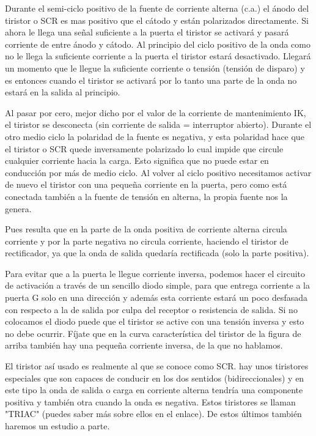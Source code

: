 \documentclass[12pt,a4paper]{article}
\begin{document}
\begin{flushleft}
\newpage
Durante el semi-ciclo positivo de la fuente de corriente alterna (c.a.) el ánodo del tiristor o SCR es mas positivo que el cátodo y están polarizados directamente. Si ahora le llega una señal suficiente a la puerta el tiristor se activará y pasará corriente de entre ánodo y cátodo. Al principio del ciclo positivo de la onda como no le llega la suficiente corriente a la puerta el tiristor estará desactivado. Llegará un momento que le llegue la suficiente corriente o tensión (tensión de disparo) y es entonces cuando el tiristor se activará por lo tanto una parte de la onda no estará en la salida al principio.\linebreak

Al pasar por cero, mejor dicho por el valor de la corriente de mantenimiento IK, el tiristor se desconecta (sin corriente de salida = interruptor abierto). Durante el otro medio ciclo la polaridad de la fuente es negativa, y esta polaridad hace que el tiristor o SCR quede inversamente polarizado lo cual impide que circule cualquier corriente hacia la carga. Esto significa que no puede estar en conducción por más de medio ciclo. Al volver al ciclo positivo necesitamos activar de nuevo el tiristor con una pequeña corriente en la puerta, pero como está conectada también a la fuente de tensión en alterna, la propia fuente nos la genera.\\
\end{flushleft}
\begin{flushleft}
Pues resulta que en la parte de la onda positiva de corriente alterna circula corriente y por la parte negativa no circula corriente, haciendo el tiristor de rectificador, ya que la onda de salida quedaría rectificada (solo la parte positiva).\linebreak

Para evitar que a la puerta le llegue corriente inversa, podemos hacer el circuito de activación a través de un sencillo diodo simple, para que entrega corriente a la puerta G solo en una dirección y además esta corriente estará un poco desfasada con respecto a la de salida por culpa del receptor o resistencia de salida. Si no colocamos el diodo puede que el tiristor se active con una tensión inversa y esto no debe ocurrir. Fíjate que en la curva característica del tiristor de la figura de arriba también hay una pequeña corriente inversa, de la que no hablamos.\linebreak

El tiristor así usado es realmente al que se conoce como SCR. hay unos tiristores especiales que son capaces de conducir en los dos sentidos (bidireccionales) y en este tipo la onda de salida o carga en corriente alterna tendría una componente positiva y también otra cuando la onda es negativa. Estos tiristores se llaman "TRIAC" (puedes saber más sobre ellos en el enlace). De estos últimos también haremos un estudio a parte.
\end{flushleft}
\end{document}
